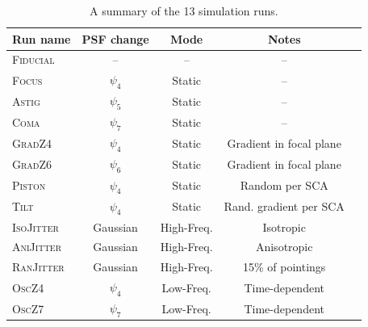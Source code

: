 \documentclass[usenatbib]{mnras}
\begin{document}
\def\arraystretch{1.4}
\setlength{\tabcolsep}{4pt}
\begin{table}
\caption{A summary of the 13 simulation runs.}
\label{table:runs}
\begin{center}
\begin{tabular}{lcccc }
\hline
\hline
Run name & PSF change & Mode & Notes \\ 
\hline
\textsc{Fiducial}              & -- & -- & -- \\
\textsc{Focus}                & $\psi_4$ & Static & --  \\
\textsc{Astig}                  & $\psi_5$ & Static &  -- \\
\textsc{Coma}                & $\psi_7$ & Static &  -- \\
\textsc{GradZ4}             & $\psi_4$ & Static & Gradient in focal plane  \\
\textsc{GradZ6}              & $\psi_6$ & Static &Gradient in focal plane    \\
\textsc{Piston} 		 & $\psi_4$ & Static  &Random per SCA   \\
\textsc{Tilt} 			 & $\psi_4$ & Static & Rand. gradient per SCA \\
\hline
\textsc{IsoJitter}		& Gaussian  & High-Freq. & Isotropic  \\
\textsc{AniJitter} 		 & Gaussian & High-Freq. & Anisotropic  \\
\textsc{RanJitter} 		 & Gaussian & High-Freq. & 15\% of pointings  \\
\hline
\textsc{OscZ4} 		 & $\psi_4$ & Low-Freq. & Time-dependent  \\
\textsc{OscZ7} 		 & $\psi_7$ & Low-Freq. & Time-dependent  \\
\hline
\hline
\end{tabular}
\end{center}
\end{table}
\end{document}
